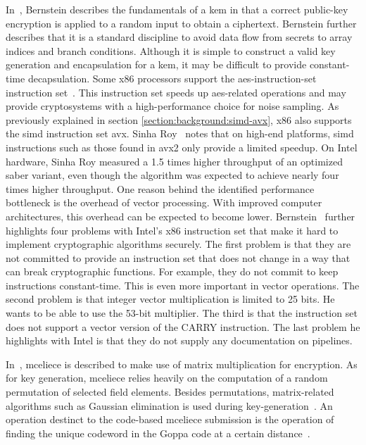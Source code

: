 In~\cite{bernstein2018}, Bernstein describes the fundamentals of a \gls{kem} in that a correct public-key encryption is applied to a random input to obtain a ciphertext. Bernstein further describes that it is a standard discipline to avoid data flow from secrets to array indices and branch conditions. Although it is simple to construct a valid key generation and encapsulation for a \gls{kem}, it may be difficult to provide constant-time decapsulation.
Some \gls{x86} processors support the \gls{aes-instruction-set} instruction set~\cite{alkim2016}. This instruction set speeds up \gls{aes}-related operations and may provide cryptosystems with a high-performance choice for noise sampling. As previously explained in section \ref{section:background:simd-avx}, \gls{x86} also supports the \gls{simd} instruction set \gls{avx}. Sinha Roy~\cite{sinha2019} notes that on high-end platforms, \gls{simd} instructions such as those found in \gls{avx2} only provide a limited speedup. On Intel hardware, Sinha Roy measured a 1.5 times higher throughput of an optimized \gls{saber} variant, even though the algorithm was expected to achieve nearly four times higher throughput. One reason behind the identified performance bottleneck is the overhead of vector processing. With improved computer architectures, this overhead can be expected to become lower. Bernstein~\cite{bernstein2014} further highlights four problems with Intel's \gls{x86} instruction set that make it hard to implement cryptographic algorithms securely. The first problem is that they are not committed to provide an instruction set that does not change in a way that can break cryptographic functions. For example, they do not commit to keep instructions constant-time. This is even more important in vector operations. The second problem is that integer vector multiplication is limited to 25 bits. He wants to be able to use the 53-bit multiplier. The third is that the instruction set does not support a vector version of the CARRY instruction. The last problem he highlights with Intel is that they do not supply any documentation on pipelines.



In~\cite{wang2018}, \gls{mceliece} is described to make use of matrix multiplication for encryption. As for key generation, \gls{mceliece} relies heavily on the computation of a random permutation of selected field elements. Besides permutations, matrix-related algorithms such as Gaussian elimination is used during key-generation~\cite{mceliece2020}. An operation destinct to the code-based \gls{mceliece} submission is the operation of finding the unique codeword in the Goppa code at a certain distance~\cite{mceliece2020}.

